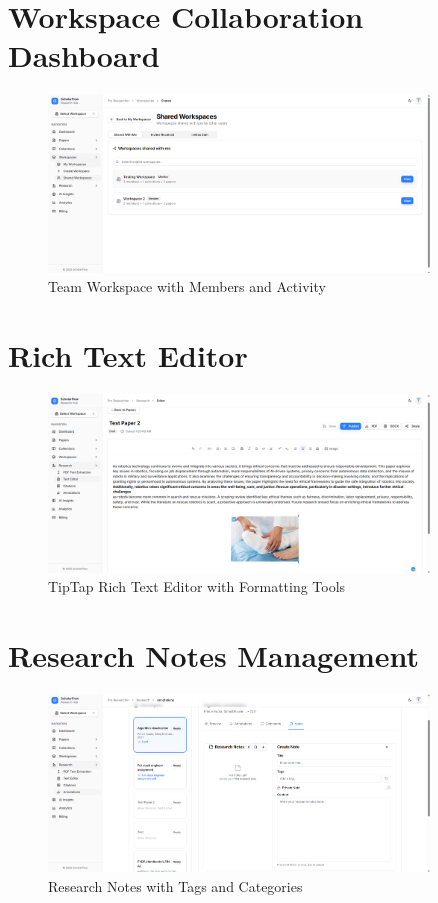 \section{Workspace Collaboration Dashboard}

\begin{figure}[H]
\centering
\includegraphics[width=0.9\textwidth]{images/screenshots/shared_workspace.png}
\caption{Team Workspace with Members and Activity}
\label{fig:ss-workspace}
\end{figure}

\section{Rich Text Editor}

\begin{figure}[H]
\centering
\includegraphics[width=0.9\textwidth]{images/screenshots/text_editor.png}
\caption{TipTap Rich Text Editor with Formatting Tools}
\label{fig:ss-editor}
\end{figure}

\section{Research Notes Management}

\begin{figure}[H]
\centering
\includegraphics[width=0.9\textwidth]{images/screenshots/research_notes.png}
\caption{Research Notes with Tags and Categories}
\label{fig:ss-notes}
\end{figure}

